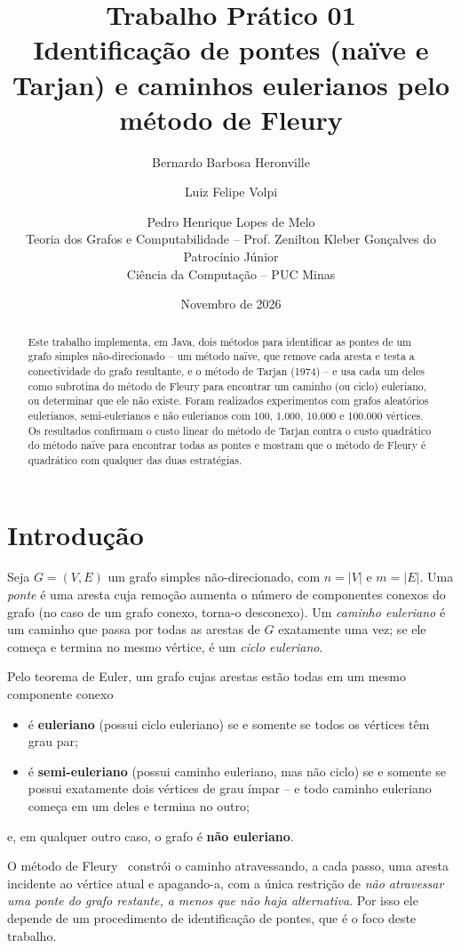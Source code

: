 \documentclass[a4paper,11pt]{article}
\title{\textbf{Trabalho Prático 01}\\[2pt]
\large Identificação de pontes (naïve e Tarjan) e caminhos eulerianos pelo método de Fleury}
\author{Bernardo Barbosa Heronville \and Luiz Felipe Volpi \and Pedro Henrique Lopes de Melo\\[6pt]
\small Teoria dos Grafos e Computabilidade -- Prof. Zenilton Kleber Gonçalves do Patrocínio Júnior\\
\small Ciência da Computação -- PUC Minas}
\date{Novembro de 2026}
\begin{document}
\maketitle

\begin{abstract}
Este trabalho implementa, em Java, dois métodos para identificar as pontes de um grafo simples
não-direcionado -- um método naïve, que remove cada aresta e testa a conectividade do grafo
resultante, e o método de Tarjan (1974) -- e usa cada um deles como subrotina do método de Fleury
para encontrar um caminho (ou ciclo) euleriano, ou determinar que ele não existe. Foram realizados
experimentos com grafos aleatórios eulerianos, semi-eulerianos e não eulerianos com 100, 1.000,
10.000 e 100.000 vértices. Os resultados confirmam o custo linear do método de Tarjan contra o custo
quadrático do método naïve para encontrar todas as pontes e mostram que o método de Fleury é
quadrático com qualquer das duas estratégias.
\end{abstract}

\section{Introdução}

Seja $G=(V,E)$ um grafo simples não-direcionado, com $n=|V|$ e $m=|E|$. Uma \emph{ponte} é uma
aresta cuja remoção aumenta o número de componentes conexos do grafo (no caso de um grafo conexo,
torna-o desconexo). Um \emph{caminho euleriano} é um caminho que passa por todas as arestas de $G$
exatamente uma vez; se ele começa e termina no mesmo vértice, é um \emph{ciclo euleriano}.

Pelo teorema de Euler, um grafo cujas arestas estão todas em um mesmo componente conexo
\begin{itemize}
  \item é \textbf{euleriano} (possui ciclo euleriano) se e somente se todos os vértices têm grau par;
  \item é \textbf{semi-euleriano} (possui caminho euleriano, mas não ciclo) se e somente se possui
        exatamente dois vértices de grau ímpar -- e todo caminho euleriano começa em um deles e termina no outro;
\end{itemize}
e, em qualquer outro caso, o grafo é \textbf{não euleriano}.

O método de Fleury~\cite{fleury} constrói o caminho atravessando, a cada passo, uma aresta incidente ao vértice
atual e apagando-a, com a única restrição de \emph{não atravessar uma ponte do grafo restante, a menos
que não haja alternativa}. Por isso ele depende de um procedimento de identificação de pontes, que é o
foco deste trabalho.
\end{document}
